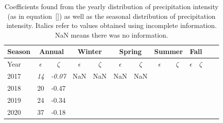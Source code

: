 \begin{table}[htb]
  \begin{center}
    \begin{tabular}{|l|*{11}{c|}r|}
      \hline
      Season    &       \multicolumn{2}{|c|}{Annual}          & \multicolumn{2}{|c|}{Winter}& \multicolumn{2}{|c|}{Spring}  & \multicolumn{2}{|c|}{Summer} &\multicolumn{2}{|c|}{Fall}  \\
      \hline
      Year      & $\epsilon $ & $\zeta$  &  $\epsilon $ & $\zeta$  &  $\epsilon $ & $\zeta$  &  $\epsilon $ & $\zeta$  & $\epsilon $ & $\zeta$ \\
      \hline
      2017      & \textit{14}  & \textit{-0.07}  & NaN & NaN & NaN & NaN &   &   &   &   \\
      2018      & 20           & -0.47  &  &  &  &  &   &   &  &   \\
      2019      & 24           & -0.34  &  &  &  &  &  &  &  &   \\
      2020      & 37          & -0.18  &  &  &  &  &   &  &  & \\
      \hline
    \end{tabular}
  \end{center}
  \caption[Year comparison of coefficients for precipitation
    intensity] {\label{fourthtable}Coefficients found from the yearly
    distribution of precipitation intensity (as in equation~\ref{}) as
    well as the seasonal distribution of precipitation
    intensity. Italics refer to values obtained using incomplete
    information. NaN means there was no information. }
\end{table}
